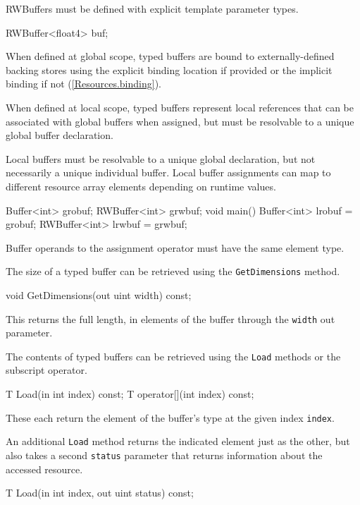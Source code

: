 RWBuffers must be defined with explicit template parameter types.
\begin{HLSL}
  RWBuffer<float4> buf;
\end{HLSL}

When defined at global scope, typed buffers are bound to externally-defined backing stores
using the explicit binding location if provided or the implicit binding if not (\ref{Resources.binding}).

When defined at local scope, typed buffers represent local references
that can be associated with global buffers when assigned,
but must be resolvable to a unique global buffer declaration.

\begin{note}
Local buffers must be resolvable to a unique global declaration, but not necessarily a unique individual buffer.
Local buffer assignments can map to different resource array elements depending on runtime values.
\end{note}

\begin{HLSL}
  Buffer<int> grobuf;
  RWBuffer<int> grwbuf;
  void main() {
    Buffer<int> lrobuf = grobuf;
    RWBuffer<int> lrwbuf = grwbuf;
  }
\end{HLSL}
Buffer operands to the assignment operator must have the same element type.


The size of a typed buffer can be retrieved using the \texttt{GetDimensions} method.
\begin{HLSL}
void GetDimensions(out uint width) const;
\end{HLSL}

This returns the full length, in elements of the buffer through the \texttt{width} out parameter.


The contents of typed buffers can be retrieved using the \texttt{Load} methods
or the subscript operator.

\begin{HLSL}
 T Load(in int index) const;
 T operator[](int index) const;
\end{HLSL}

These each return the element of the buffer's type at the given index \texttt{index}.

An additional \texttt{Load} method returns the indicated element just as the other,
but also takes a second \texttt{status} parameter that returns information about the accessed resource.
\begin{HLSL}
 T Load(in int index, out uint status) const;
\end{HLSL}

